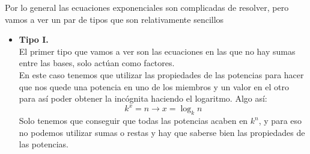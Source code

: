 \documentclass[a4paper,11pt,answers]{exam}
\begin{document}
Por lo general las ecuaciones exponenciales son complicadas de resolver, pero vamos a ver
un par de tipos que son relativamente sencillos
\begin{itemize}
\item \large{\textbf{Tipo I.}}\\
  El primer tipo que vamos a ver son las ecuaciones en las que no hay sumas entre las bases, solo
  actúan como  factores.\\
  En este caso tenemos que utilizar las propiedades de las potencias para hacer que nos quede una
  potencia en uno de los miembros y un valor en el otro para así poder obtener la incógnita
  haciendo el logaritmo. Algo así:
  \[k^x = n \longrightarrow x = \log_k n\]
  Solo tenemos que conseguir que todas las potencias acaben en $k^n$, y para eso no podemos
  utilizar sumas o restas y hay que saberse bien las propiedades de las potencias.\\


\end{itemize}
\end{document}
